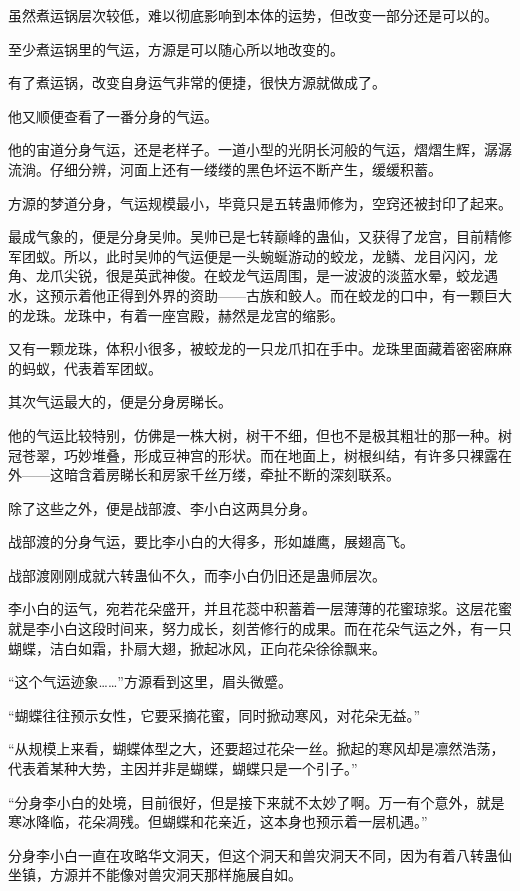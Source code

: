\begin{this_body}
虽然煮运锅层次较低，难以彻底影响到本体的运势，但改变一部分还是可以的。

至少煮运锅里的气运，方源是可以随心所以地改变的。

有了煮运锅，改变自身运气非常的便捷，很快方源就做成了。

他又顺便查看了一番分身的气运。

他的宙道分身气运，还是老样子。一道小型的光阴长河般的气运，熠熠生辉，潺潺流淌。仔细分辨，河面上还有一缕缕的黑色坏运不断产生，缓缓积蓄。

方源的梦道分身，气运规模最小，毕竟只是五转蛊师修为，空窍还被封印了起来。

最成气象的，便是分身吴帅。吴帅已是七转巅峰的蛊仙，又获得了龙宫，目前精修军团蚁。所以，此时吴帅的气运便是一头蜿蜒游动的蛟龙，龙鳞、龙目闪闪，龙角、龙爪尖锐，很是英武神俊。在蛟龙气运周围，是一波波的淡蓝水晕，蛟龙遇水，这预示着他正得到外界的资助——古族和鲛人。而在蛟龙的口中，有一颗巨大的龙珠。龙珠中，有着一座宫殿，赫然是龙宫的缩影。

又有一颗龙珠，体积小很多，被蛟龙的一只龙爪扣在手中。龙珠里面藏着密密麻麻的蚂蚁，代表着军团蚁。

其次气运最大的，便是分身房睇长。

他的气运比较特别，仿佛是一株大树，树干不细，但也不是极其粗壮的那一种。树冠苍翠，巧妙堆叠，形成豆神宫的形状。而在地面上，树根纠结，有许多只裸露在外——这暗含着房睇长和房家千丝万缕，牵扯不断的深刻联系。

除了这些之外，便是战部渡、李小白这两具分身。

战部渡的分身气运，要比李小白的大得多，形如雄鹰，展翅高飞。

战部渡刚刚成就六转蛊仙不久，而李小白仍旧还是蛊师层次。

李小白的运气，宛若花朵盛开，并且花蕊中积蓄着一层薄薄的花蜜琼浆。这层花蜜就是李小白这段时间来，努力成长，刻苦修行的成果。而在花朵气运之外，有一只蝴蝶，洁白如霜，扑扇大翅，掀起冰风，正向花朵徐徐飘来。

“这个气运迹象……”方源看到这里，眉头微蹙。

“蝴蝶往往预示女性，它要采摘花蜜，同时掀动寒风，对花朵无益。”

“从规模上来看，蝴蝶体型之大，还要超过花朵一丝。掀起的寒风却是凛然浩荡，代表着某种大势，主因并非是蝴蝶，蝴蝶只是一个引子。”

“分身李小白的处境，目前很好，但是接下来就不太妙了啊。万一有个意外，就是寒冰降临，花朵凋残。但蝴蝶和花亲近，这本身也预示着一层机遇。”

分身李小白一直在攻略华文洞天，但这个洞天和兽灾洞天不同，因为有着八转蛊仙坐镇，方源并不能像对兽灾洞天那样施展自如。


\end{this_body}
